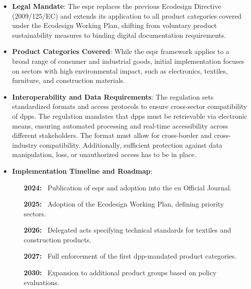 \begin{itemize}[itemsep=0.5\baselineskip]
    \item \textbf{Legal Mandate}: The \ac{espr} replaces the previous Ecodesign Directive (2009/125/EC) and extends its application to all product categories covered under the Ecodesign Working Plan, shifting from voluntary product sustainability measures to binding digital documentation requirements. \autocite{EuropeanParliamentandCouncil.2024}

    \item \textbf{Product Categories Covered}: While the \ac{espr} framework applies to a broad range of consumer and industrial goods, initial implementation focuses on sectors with high environmental impact, such as electronics, textiles, furniture, and construction materials.

    \item \textbf{Interoperability and Data Requirements}: The regulation sets standardized formats and access protocols to ensure cross-sector compatibility of \ac{dpp}s. The regulation mandates that \ac{dpp}s must be retrievable via electronic means, ensuring automated processing and real-time accessibility across different stakeholders. The format must allow for cross-border and cross-industry compatibility. Additionally, sufficient protection against data manipulation, loss, or unauthorized access has to be in place.

    \item \textbf{Implementation Timeline and Roadmap}:
        \begin{itemize}
            \item[\textbf{2024:}~] Publication of \ac{espr} and adoption into the \ac{eu} Official Journal.

            \item[\textbf{2025:}~] Adoption of the Ecodesign Working Plan, defining priority sectors.

            \item[\textbf{2026:}~] Delegated acts specifying technical standards for textiles and construction products.

            \item[\textbf{2027:}~] Full enforcement of the first \ac{dpp}-mandated product categories.

            \item[\textbf{2030:}~] Expansion to additional product groups based on policy evaluations.
        \end{itemize}
\end{itemize}

